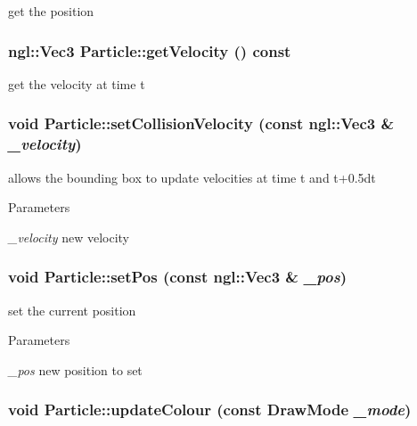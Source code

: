 get the position \hypertarget{classParticle_a3d46d63eefd8b6af8185907d545a973d}{
\subsubsection[{getVelocity}]{\setlength{\rightskip}{0pt plus 5cm}ngl::Vec3 Particle::getVelocity () const}}
\label{classParticle_a3d46d63eefd8b6af8185907d545a973d}


get the velocity at time t \hypertarget{classParticle_aaaecbd96e5c316275c3d208a45fc6c14}{
\subsubsection[{setCollisionVelocity}]{\setlength{\rightskip}{0pt plus 5cm}void Particle::setCollisionVelocity (const ngl::Vec3 \& {\em \_\-velocity})}}
\label{classParticle_aaaecbd96e5c316275c3d208a45fc6c14}


allows the bounding box to update velocities at time t and t+0.5dt 
\begin{DoxyParams}{Parameters}
\item[{\em \_\-velocity}]new velocity \end{DoxyParams}
\hypertarget{classParticle_ab78251d2269e22e833f9b7dfb45e832d}{
\subsubsection[{setPos}]{\setlength{\rightskip}{0pt plus 5cm}void Particle::setPos (const ngl::Vec3 \& {\em \_\-pos})}}
\label{classParticle_ab78251d2269e22e833f9b7dfb45e832d}


set the current position 
\begin{DoxyParams}{Parameters}
\item[{\em \_\-pos}]new position to set \end{DoxyParams}
\hypertarget{classParticle_a5035778e0aa62ed6bc2d7f0ae45f723b}{
\subsubsection[{updateColour}]{\setlength{\rightskip}{0pt plus 5cm}void Particle::updateColour (const {\bf DrawMode} {\em \_\-mode})}}
\label{classParticle_a5035778e0aa62ed6bc2d7f0ae45f723b}


